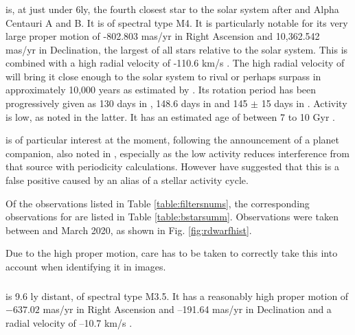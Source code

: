 \subsubsection{\bstar}
\protect\label{section:introbstar}
{\bstar} is, at just under 6ly, the fourth closest star to the solar system after {\prox} and Alpha Centauri A and B. It is of spectral type M4.
It is particularly notable for its very large proper motion of {-}802.803 mas/yr
in Right Ascension and 10,362.542 mas/yr in Declination, the largest of all stars relative to the solar system. This is combined with a high radial velocity
of {-}110.6 km/s \citep{bobylev17}.
The high radial velocity of {\bstar} will bring it close enough
to the solar system to rival or perhaps surpass {\prox} in approximately 10,000 years as estimated by \citet{bobylev10}.
Its rotation period has been progressively given as 130 days in
\citet{benedict98}, 148.6 days in \citet{suarezmascareno15} and 145 $\pm$ 15 days in \citet{toledopadron18}. Activity is low, as noted in the latter.
It has an estimated age of between 7 to 10 Gyr \citep{ribas18}.

{\bstar} is of particular interest at the moment, following the announcement of
a planet companion, also noted in \citet{ribas18}, especially as the low activity reduces interference from that source
with periodicity calculations. However \citet{lubin21} have suggested that this
is a false positive caused by an alias of a stellar activity cycle.

Of the observations listed in Table \ref{table:filtersnums}, the corresponding observations for {\bstar} are listed in Table \ref{table:bstarsumm}.
Observations were taken between  and March 2020, as shown
in Fig.
\ref{fig:rdwarfhist}.

Due to the high proper motion, care has to be taken to correctly take this into account when identifying it in images.


\subsubsection{\ross}
\protect\label{section:introross}
{\ross} is 9.6 ly distant, of spectral type M3.5. It has a reasonably high
proper motion of $-637.02$ mas/yr in Right Ascension and  {–}191.64 mas/yr
in Declination and a radial velocity of {–}10.7 km/s \citep{vanleeuwen07}.

